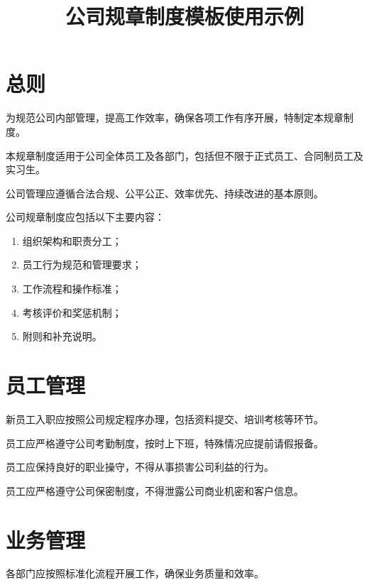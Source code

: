 \documentclass[large]{company-rules}
\title{公司规章制度模板使用示例}
\author{} %
\date{}   %
\begin{document}

\maketitle

\section{总则}

为规范公司内部管理，提高工作效率，确保各项工作有序开展，特制定本规章制度。

本规章制度适用于公司全体员工及各部门，包括但不限于正式员工、合同制员工及实习生。

公司管理应遵循合法合规、公平公正、效率优先、持续改进的基本原则。

公司规章制度应包括以下主要内容：
\begin{enumerate}
    \item 组织架构和职责分工；
    \item 员工行为规范和管理要求；
    \item 工作流程和操作标准；
    \item 考核评价和奖惩机制；
    \item 附则和补充说明。
\end{enumerate}

\section{员工管理}

新员工入职应按照公司规定程序办理，包括资料提交、培训考核等环节。

员工应严格遵守公司考勤制度，按时上下班，特殊情况应提前请假报备。

员工应保持良好的职业操守，不得从事损害公司利益的行为。

员工应严格遵守公司保密制度，不得泄露公司商业机密和客户信息。

\section{业务管理}

各部门应按照标准化流程开展工作，确保业务质量和效率。
\end{document}
